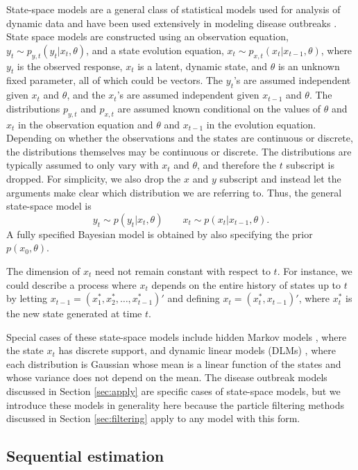 \documentclass{elsarticle}
\begin{document}
State-space models are a general class of statistical models used for analysis of dynamic data and have been used extensively in modeling disease outbreaks \citep{Mart:Cone:Lope:Lope:baye:2008,watkins2009disease,merl2009statistical,ludkovski2010optimal,skvortsov2012monitoring}.  State space models are constructed using an observation equation, $y_t \sim p_{y,t}(y_t|x_t,\theta)$, and a state evolution equation, $x_t \sim p_{x,t}(x_t|x_{t-1},\theta)$, where $y_t$ is the observed response, $x_t$ is a latent, dynamic state, and $\theta$ is an unknown fixed parameter, all of which could be vectors. The $y_t$'s are assumed independent given $x_t$ and $\theta$, and the $x_t$'s are assumed independent given $x_{t-1}$ and $\theta$. The distributions $p_{y,t}$ and $p_{x,t}$ are assumed known conditional on the values of $\theta$ and $x_t$ in the observation equation and $\theta$ and $x_{t-1}$ in the evolution equation. Depending on whether the observations and the states are continuous or discrete, the distributions themselves may be continuous or discrete. The distributions are typically assumed to only vary with $x_t$ and $\theta$, and therefore the $t$ subscript is dropped. For simplicity, we also drop the $x$ and $y$ subscript and instead let the arguments make clear which distribution we are referring to. Thus, the general state-space model is
\[
y_t \sim p(y_t|x_t,\theta) \qquad
x_t \sim p(x_t|x_{t-1},\theta).
\]
A fully specified Bayesian model is obtained by also specifying the prior $p(x_0,\theta)$.

The dimension of $x_t$ need not remain constant with respect to $t$. For instance, we could describe a process where $x_t$ depends on the entire history of states up to $t$ by letting $x_{t-1} = (x^*_1, x^*_2, \ldots, x^*_{t-1})'$ and defining $x_t = (x^*_t, x_{t-1})'$, where $x^*_t$ is the new state generated at time $t$.

Special cases of these state-space models include hidden Markov models \citep{cappe2005inference,petris2009dynamic}, where the state $x_t$ has discrete support, and dynamic linear models (DLMs) \citep{West:Harr:baye:1997}, where each distribution is Gaussian whose mean is a linear function of the states and whose variance does not depend on the mean. The disease outbreak models discussed in Section \ref{sec:apply} are specific cases of state-space models, but we introduce these models in generality here because the particle filtering methods discussed in Section \ref{sec:filtering} apply to any model with this form.

\subsection{Sequential estimation \label {sec:sequential}}
\end{document}
